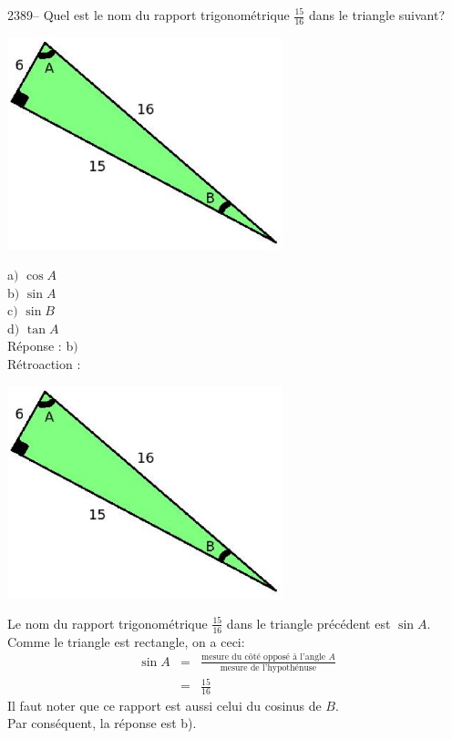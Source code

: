 \documentclass[letterpaper, 12pt]{article}
\begin{document}
2389-- Quel est le nom du rapport trigonom\'etrique $\frac{15}{16}$ dans le triangle suivant?\\
\begin{center}
 \includegraphics[width=8cm,bb=14 14 415 315]{Q2389.eps}
\end{center}
a$)$ $\cos{A}$\\
b$)$ $\sin{A}$\\
c$)$ $\sin{B}$\\
d$)$ $\tan{A}$\\

R\'eponse : b$)$\\

R\'etroaction :\\
\begin{center}
 \includegraphics[width=8cm,bb=14 14 415 315]{Q2389.eps}
\end{center}
Le nom du rapport trigonom\'etrique $\frac{15}{16}$ dans le triangle pr\'ec\'edent est $\sin{A}$. Comme le triangle est rectangle, on a ceci:
\begin{eqnarray*}
  \sin{A}&=&\frac{\textrm{mesure du c\^ot\'e oppos\'e \`a l'angle $A$}}{\textrm{mesure de l'hypoth\'enuse}}\\[2mm]
&=&\frac{15}{16}
\end{eqnarray*}
Il faut noter que ce rapport est aussi celui du cosinus de $B$.\\
Par cons\'equent, la r\'eponse est b).\\
\end{document}
